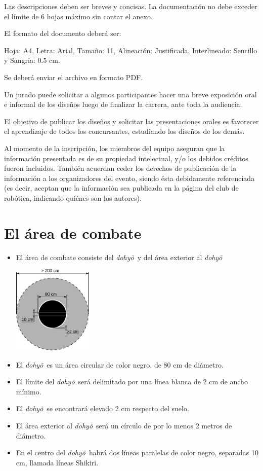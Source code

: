 \documentclass[a4paper,11pt]{article}
\newcommand{\cm}{\ensuremath{\mbox{~cm}}}
\newcommand{\dojo}{\emph{dohy\~{o}}~}
\begin{document}
Las descripciones deben ser breves y concisas. La documentación no debe exceder el límite de 6 hojas máximo sin contar el anexo. 

El formato del documento deberá ser: 

Hoja: A4, Letra: Arial, Tamaño: 11, Alineación: Justificada, Interlineado: Sencillo y Sangría: $0.5\cm$. 

Se deberá enviar el archivo en formato PDF.

Un jurado puede solicitar a algunos participantes hacer una breve exposición oral e informal de los diseños luego de finalizar la carrera, ante toda la audiencia.

El objetivo de publicar los diseños y solicitar las presentaciones orales es favorecer el aprendizaje de todos los concursantes, estudiando los diseños de los demás.

Al momento de la inscripción, los miembros del equipo aseguran que la información presentada es de su propiedad intelectual, y/o los debidos créditos fueron incluidos. También acuerdan ceder los derechos de publicación de la información a los organizadores del evento, siendo ésta debidamente referenciada (es decir, aceptan que la información sea publicada en la página del club de robótica, indicando quiénes son los autores).


\section*{El área de combate}
\begin{itemize}
  \item El área de combate consiste del \dojo y del área exterior al \dojo
  \begin{center}
    \includegraphics[width=0.3\textwidth]{doyho_mini_sumo}
  \end{center}
  \item El \dojo es un área circular de color negro, de 80 cm de diámetro.
  \item El límite del \dojo será delimitado por una línea blanca de 2 cm de ancho mínimo.
  \item El \dojo se encontrará elevado 2 cm respecto del suelo.
  \item El área exterior al \dojo será un círculo de por lo menos 2 metros de diámetro.
  \item En el centro del \dojo habrá dos líneas paralelas de color negro, separadas 10 cm, llamada líneas Shikiri.
\end{itemize}
\end{document}
